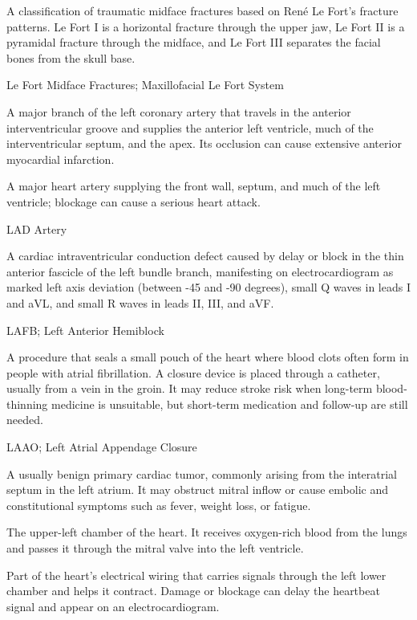  A classification of traumatic midface fractures based on René Le Fort's fracture patterns. Le Fort I is a horizontal fracture through the upper jaw, Le Fort II is a pyramidal fracture through the midface, and Le Fort III separates the facial bones from the skull base.

\synonyms
Le Fort Midface Fractures; Maxillofacial Le Fort System

 A major branch of the left coronary artery that travels in the anterior interventricular
groove and supplies the anterior left ventricle, much of the interventricular septum,
and the apex. Its occlusion can cause extensive anterior myocardial infarction.

 A major heart artery supplying the front wall, septum, and much of the left ventricle; blockage can cause a serious heart attack.

\synonyms
LAD Artery

 A cardiac intraventricular conduction defect caused by delay or block in the thin anterior fascicle of the left bundle branch, manifesting on electrocardiogram as marked left axis deviation (between -45 and -90 degrees), small Q waves in leads I and aVL, and small R waves in leads II, III, and aVF.

\synonyms
LAFB; Left Anterior Hemiblock

 A procedure that seals a small pouch of the heart where blood clots often form in people with atrial fibrillation. A closure device is placed through a catheter, usually from a vein in the groin. It may reduce stroke risk when long-term blood-thinning medicine is unsuitable, but short-term medication and follow-up are still needed.

\synonyms
LAAO; Left Atrial Appendage Closure

 A usually benign primary cardiac tumor, commonly arising from the interatrial septum in the left
atrium. It may obstruct mitral inflow or cause embolic and constitutional symptoms such as
fever, weight loss, or fatigue.

 The upper-left chamber of the heart. It receives oxygen-rich blood from the lungs and passes it through the mitral valve into the left ventricle.

 Part of the heart’s electrical wiring that carries signals through the left lower chamber and helps it contract. Damage or blockage can delay the heartbeat signal and appear on an electrocardiogram.

